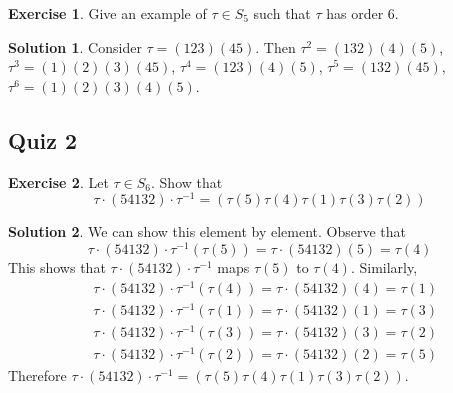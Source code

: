 \documentclass[12pt]{article}
\theoremstyle{definition}
\newtheorem{exercise}{Exercise}
\theoremstyle{definition}
\newtheorem{solution}{Solution}
\begin{document}
\begin{exercise}
Give an example of $\tau \in S_5$ such that $\tau$ has order 6. 
\end{exercise}
\begin{solution}
Consider $\tau = (123)(45)$. Then $\tau^2 = (132)(4)(5)$, $\tau^3 = (1)(2)(3)(45)$, $\tau^4 = (123)(4)(5)$, $\tau^5 = (132)(45)$, $\tau^6 = (1)(2)(3)(4)(5)$.
\end{solution}

\subsection{Quiz 2}
\begin{exercise}
Let $\tau \in S_6$. Show that
\begin{equation*}
\tau \cdot (5 4 1 3 2) \cdot \tau^{-1} = (\tau(5) \tau(4) \tau(1) \tau(3) \tau(2))
\end{equation*}
\end{exercise}

\begin{solution}
We can show this element by element. Observe that
\begin{equation}
	\tau \cdot (54132) \cdot \tau^{-1}(\tau(5)) = \tau \cdot (54132)(5) = \tau(4)
\end{equation}
This shows that $\tau \cdot (54132) \cdot \tau^{-1}$ maps $\tau(5)$ to $\tau(4)$. Similarly,
\begin{align}
&\tau \cdot (54132) \cdot \tau^{-1}(\tau(4)) = \tau \cdot (54132)(4) = \tau(1) \\
&\tau \cdot (54132) \cdot \tau^{-1}(\tau(1)) = \tau \cdot (54132)(1) = \tau(3) \\
&\tau \cdot (54132) \cdot \tau^{-1}(\tau(3)) = \tau \cdot (54132)(3) = \tau(2) \\
&\tau \cdot (54132) \cdot \tau^{-1}(\tau(2)) = \tau \cdot (54132)(2) = \tau(5) 
\end{align}
Therefore $\tau \cdot (5 4 1 3 2) \cdot \tau^{-1} = (\tau(5) \tau(4) \tau(1) \tau(3) \tau(2))
$.
\end{solution}		
\end{document}
